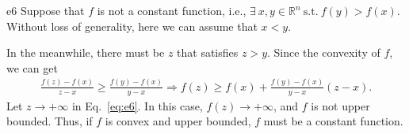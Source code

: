 \documentclass{article}
\begin{document}
\begin{PROOF}{e6}
Suppose that $f$ is not a constant function, i.e., $\exists~x, y \in \mathbb{R}^n~\text{s.t.}~f(y) > f(x)$. Without loss of generality, here we can assume that $x < y$.

In the meanwhile, there must be $z$ that satisfies $z > y$. Since the convexity of $f$, we can get
\begin{equation}\label{eq:e6}
\begin{aligned}
    \frac{f(z)-f(x)}{z - x} \ge \frac{f(y) - f(x)}{y - x} \Rightarrow f(z) \ge f(x) + \frac{f(y) - f(x)}{y - x} (z - x).
\end{aligned}
\end{equation}
Let $z \to +\infty$ in Eq.~\ref{eq:e6}. In this case, $f(z) \to +\infty$, and $f$ is not upper bounded. Thus, if $f$ is convex and upper bounded, $f$ must be a constant function\cite{518103}.
\end{PROOF}



\end{document}
